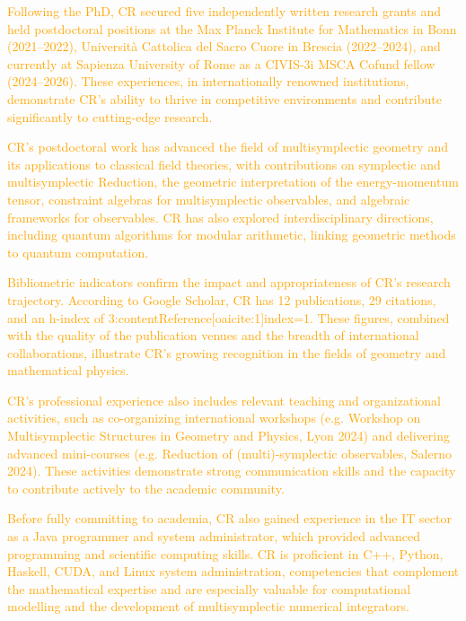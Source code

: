 \documentclass[11pt,draftproposal]{msca-pf}
\begin{document}
\textcolor{orange}{Following the PhD, CR secured five independently written research grants and held postdoctoral positions at the Max Planck Institute for Mathematics in Bonn (2021–2022), Università Cattolica del Sacro Cuore in Brescia (2022–2024), and currently at Sapienza University of Rome as a CIVIS-3i MSCA Cofund fellow (2024–2026). These experiences, in internationally renowned institutions, demonstrate CR’s ability to thrive in competitive environments and contribute significantly to cutting-edge research.}  

\textcolor{orange}{CR’s postdoctoral work has advanced the field of multisymplectic geometry and its applications to classical field theories, with contributions on symplectic and multisymplectic Reduction, the geometric interpretation of the energy-momentum tensor, constraint algebras for multisymplectic observables, and algebraic frameworks for observables. CR has also explored interdisciplinary directions, including quantum algorithms for modular arithmetic, linking geometric methods to quantum computation.}  

\textcolor{orange}{Bibliometric indicators confirm the impact and appropriateness of CR’s research trajectory. According to Google Scholar, CR has 12 publications, 29 citations, and an h-index of 3:contentReference[oaicite:1]{index=1}. These figures, combined with the quality of the publication venues and the breadth of international collaborations, illustrate CR’s growing recognition in the fields of geometry and mathematical physics.}  

\textcolor{orange}{CR’s professional experience also includes relevant teaching and organizational activities, such as co-organizing international workshops (e.g. Workshop on Multisymplectic Structures in Geometry and Physics, Lyon 2024) and delivering advanced mini-courses (e.g. Reduction of (multi)-symplectic observables, Salerno 2024). These activities demonstrate strong communication skills and the capacity to contribute actively to the academic community.}  

\textcolor{orange}{Before fully committing to academia, CR also gained experience in the IT sector as a Java programmer and system administrator, which provided advanced programming and scientific computing skills. CR is proficient in C++, Python, Haskell, CUDA, and Linux system administration, competencies that complement the mathematical expertise and are especially valuable for computational modelling and the development of multisymplectic numerical integrators.}  
\end{document}
